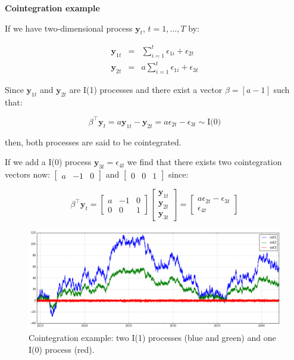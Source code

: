 \newpage
\textbf{Cointegration example} \quad

If we have two-dimensional process $\mathbf{y}_t$, $t=1,\dots,T$ by:

\begin{eqnarray*}
\mathbf{y}_{1t} &=& \sum_{i=1}^t \epsilon_{1i} + \epsilon_{2t} \\
\mathbf{y}_{2t} &=& a \sum_{i=1}^t \epsilon_{1i} + \epsilon_{3t} 
\end{eqnarray*}

Since $\mathbf{y}_{1t}$ and $\mathbf{y}_{2t}$ are I(1) processes and there
exist a vector $\beta = [a -1]$ such that:

\[
\beta^\top \mathbf{y}_t = a \mathbf{y}_{1t} -\mathbf{y}_{2t} = 
a\epsilon_{2t} - \epsilon_{3t} \sim \text{I(0)}
\]

then, both processes are said to be cointegrated. 


If we add a I(0) process
$\mathbf{y}_{3t} = \epsilon_{4t}$  we find that there exists two cointegration
vectors now: $\begin{bmatrix}a &-1& 0\end{bmatrix}$ and $\begin{bmatrix}0
&0&1\end{bmatrix}$ since:

\[
\beta^\top \mathbf{y}_t = 
\begin{bmatrix}
a & -1 & 0 \\
0 & 0 & 1
\end{bmatrix} 
\begin{bmatrix} 
\mathbf{y}_{1t} \\
\mathbf{y}_{2t} \\
\mathbf{y}_{3t}
\end{bmatrix} = 
\begin{bmatrix}
a\epsilon_{2t} - \epsilon_{3t} \\
\epsilon_{4t}
\end{bmatrix}
\]



\begin{figure}[!h]
  \centering
  \includegraphics[width=\textwidth]{img/coint-example}
  \caption{Cointegration example: two I(1) processes (blue and green) and one I(0) process (red).}
  \label{fig:cointex}
\end{figure}


